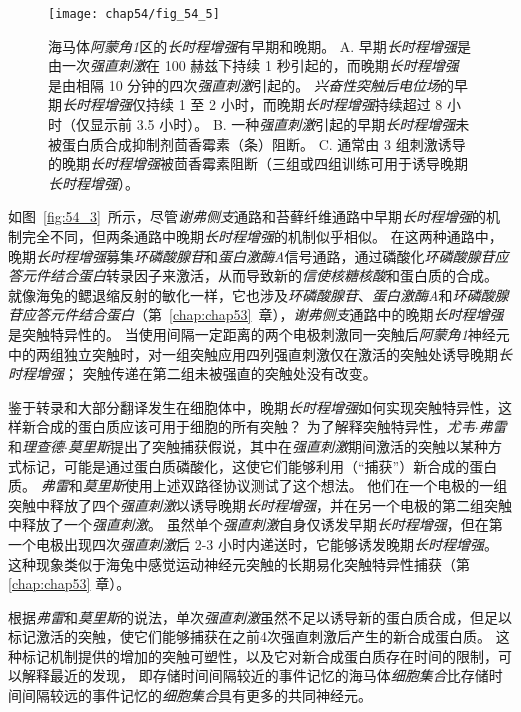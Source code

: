\begin{figure}[htbp]
	\centering
	\texttt{[image: chap54/fig\_54\_5]}
	\caption{海马体\textit{阿蒙角1}区的\textit{长时程增强}有早期和晚期。
		A. 早期\textit{长时程增强}是由一次\textit{强直刺激}在 100 赫兹下持续 1 秒引起的，而晚期\textit{长时程增强}是由相隔 10 分钟的四次\textit{强直刺激}引起的。
		\textit{兴奋性突触后电位场}的早期\textit{长时程增强}仅持续 1 至 2 小时，而晚期\textit{长时程增强}持续超过 8 小时（仅显示前 3.5 小时）。
		B. 一种\textit{强直刺激}引起的早期\textit{长时程增强}未被蛋白质合成抑制剂茴香霉素（条）阻断。
		C. 通常由 3 组刺激诱导的晚期\textit{长时程增强}被茴香霉素阻断（三组或四组训练可用于诱导晚期\textit{长时程增强}）\cite{huang1994recruitment}。}
	\label{fig:54_5}
\end{figure}


如图~\ref{fig:54_3}~所示，尽管\textit{谢弗侧支}通路和苔藓纤维通路中早期\textit{长时程增强}的机制完全不同，但两条通路中晚期\textit{长时程增强}的机制似乎相似。
在这两种通路中，晚期\textit{长时程增强}募集\textit{环磷酸腺苷}和\textit{蛋白激酶A}信号通路，通过磷酸化\textit{环磷酸腺苷应答元件结合蛋白}转录因子来激活，从而导致新的\textit{信使核糖核酸}和蛋白质的合成。
就像海兔的鳃退缩反射的敏化一样，它也涉及\textit{环磷酸腺苷}、\textit{蛋白激酶A}和\textit{环磷酸腺苷应答元件结合蛋白}（第~\ref{chap:chap53}~章），\textit{谢弗侧支}通路中的晚期\textit{长时程增强}是突触特异性的。
当使用间隔一定距离的两个电极刺激同一突触后\textit{阿蒙角1}神经元中的两组独立突触时，对一组突触应用四列强直刺激仅在激活的突触处诱导晚期\textit{长时程增强}；
突触传递在第二组未被强直的突触处没有改变。


鉴于转录和大部分翻译发生在细胞体中，晚期\textit{长时程增强}如何实现突触特异性，这样新合成的蛋白质应该可用于细胞的所有突触？
为了解释突触特异性，\textit{尤韦$\cdot$弗雷}和\textit{理查德$\cdot$莫里斯}提出了突触捕获假说，其中在\textit{强直刺激}期间激活的突触以某种方式标记，可能是通过蛋白质磷酸化，这使它们能够利用（“捕获”）新合成的蛋白质。
\textit{弗雷}和\textit{莫里斯}使用上述双路径协议测试了这个想法。
他们在一个电极的一组突触中释放了四个\textit{强直刺激}以诱导晚期\textit{长时程增强}，并在另一个电极的第二组突触中释放了一个\textit{强直刺激}。
虽然单个\textit{强直刺激}自身仅诱发早期\textit{长时程增强}，但在第一个电极出现四次\textit{强直刺激}后 2-3 小时内递送时，它能够诱发晚期\textit{长时程增强}。
这种现象类似于海兔中感觉运动神经元突触的长期易化突触特异性捕获（第 \ref{chap:chap53} 章）。


根据\textit{弗雷}和\textit{莫里斯}的说法，单次\textit{强直刺激}虽然不足以诱导新的蛋白质合成，但足以标记激活的突触，使它们能够捕获在之前4次强直刺激后产生的新合成蛋白质。
这种标记机制提供的增加的突触可塑性，以及它对新合成蛋白质存在时间的限制，可以解释最近的发现，
即存储时间间隔较近的事件记忆的海马体\textit{细胞集合}比存储时间间隔较远的事件记忆的\textit{细胞集合}具有更多的共同神经元。


